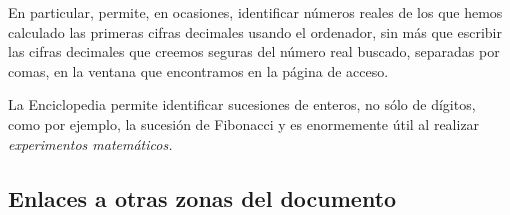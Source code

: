 En particular, permite, en ocasiones,  identificar n\'umeros reales de los que
hemos calculado las primeras cifras decimales usando el ordenador, sin m\'as
que escribir las cifras decimales que creemos seguras del
n\'umero real buscado, separadas por comas,   en la ventana que encontramos en
la p\'agina de acceso. 


La Enciclopedia permite identificar sucesiones  de enteros, no
s\'olo de d\'igitos, como por ejemplo, la sucesi\'on de Fibonacci y es
enormemente \'util al realizar {\itshape experimentos matem\'aticos.}
 



\subsection{Enlaces a otras zonas del documento}



